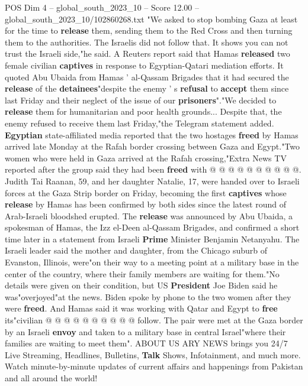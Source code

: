 \begin{textsample}{POS Dim 4 – global\_south\_2023\_10 – Score 12.00 – global\_south\_2023\_10/102860268.txt}  \label{ex:f4_pos_433}
"We asked to stop bombing Gaza at least for the time to \textbf{release} them, sending them to the Red Cross and then turning them to the authorities.
The Israelis did not follow that.
It shows you can not trust the Israeli side,"he said.
A Reuters report said that Hamas \textbf{released} two female civilian \textbf{captives} in response to Egyptian-Qatari mediation efforts.
It quoted Abu Ubaida from Hamas ' al-Qassam Brigades that it had secured the \textbf{release} of the \textbf{detainees}"despite the enemy ' s \textbf{refusal} to \textbf{accept} them since last Friday and their neglect of the issue of our \textbf{prisoners}"."We decided to \textbf{release} them for humanitarian and poor health grounds...
Despite that, the enemy refused to receive them last Friday,"the Telegram statement added. \textbf{Egyptian} state-affiliated media reported that the two hostages \textbf{freed} by Hamas arrived late Monday at the Rafah border crossing between Gaza and Egypt."Two women who were held in Gaza arrived at the Rafah crossing,"Extra News TV reported after the group said they had been \textbf{freed} with @ @ @ @ @ @ @ @ @ @.
Judith Tai Raanan, 59, and her daughter Natalie, 17, were handed over to Israeli forces at the Gaza Strip border on Friday, becoming the first \textbf{captives} whose \textbf{release} by Hamas has been confirmed by both sides since the latest round of Arab-Israeli bloodshed erupted.
The \textbf{release} was announced by Abu Ubaida, a spokesman of Hamas, the Izz el-Deen al-Qassam Brigades, and confirmed a short time later in a statement from Israeli \textbf{Prime} Minister Benjamin Netanyahu.
The Israeli leader said the mother and daughter, from the Chicago suburb of Evanston, Illinois, were"on their way to a meeting point at a military base in the center of the country, where their family members are waiting for them."No details were given on their condition, but US \textbf{President} Joe Biden said he was"overjoyed"at the news.
Biden spoke by phone to the two women after they were \textbf{freed}.
And Hamas said it was working with Qatar and Egypt to \textbf{free} its"civilian @ @ @ @ @ @ @ @ @ @ follow.
The pair were met at the Gaza border by an Israeli \textbf{envoy} and taken to a military base in central Israel"where their families are waiting to meet them".
ABOUT US ARY NEWS brings you 24/7 Live Streaming, Headlines, Bulletins, \textbf{Talk} Shows, Infotainment, and much more.
Watch minute-by-minute updates of current affairs and happenings from Pakistan and all around the world!

\end{textsample}
